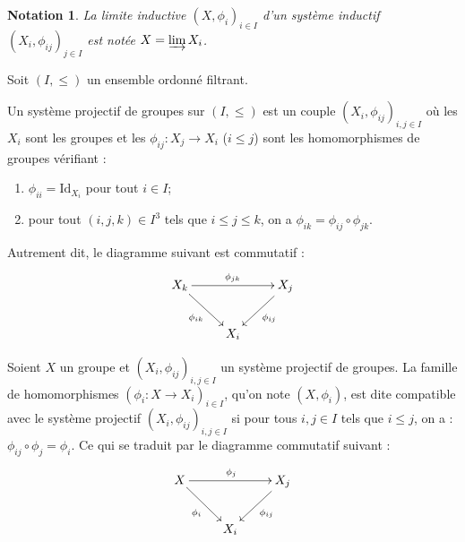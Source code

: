 \documentclass[9pt]{beamer}
\newtheorem{mynotation}{Notation}
\begin{document}
\begin{frame}
	\begin{mynotation}
La limite inductive \((X, \phi_i)_{i \in I}\) d'un système inductif \((X_i, \phi_{ij})_{j \in I}\) est notée \(X = \varinjlim X_i\).
	\end{mynotation}
	
	Soit $(I, \leq)$ un ensemble ordonné filtrant.
	
	\begin{definition}
Un système projectif de groupes sur \((I, \leq)\) est un couple \((X_{i}, \phi_{ij})_{i,j \in I}\) où les \(X_{i}\) sont les groupes et les \(\phi_{ij}: X_{j} \rightarrow X_{i}\) (\(i \leq j\)) sont les homomorphismes de groupes vérifiant :
		\begin{enumerate}[label=\roman*)]
			\item \(\phi_{ii} = \text{Id}_{X_{i}}\) pour tout \(i \in I\);
			\item pour tout \((i,j,k) \in I^{3}\) tels que \(i \leq j \leq k\), on a \(\phi_{ik} = \phi_{ij} \circ \phi_{jk}\).
		\end{enumerate}
Autrement dit, le diagramme suivant est commutatif :
		\[
		\xymatrix{
			X_{k} \ar[rr]^{\phi_{jk}} \ar[dr]_{\phi_{ik}} & & X_{j} \ar[dl]^{\phi_{ij}} \\
			& X_{i} &
		}
		\]
	\end{definition}

\end{frame}

\begin{frame}
\begin{definition}
Soient \(X\) un groupe et \((X_{i}, \phi_{ij})_{i,j \in I}\) un système projectif de groupes. La famille de homomorphismes \((\phi_{i} : X \rightarrow X_{i})_{i \in I}\), qu'on note \((X , \phi_{i})\), est dite compatible avec le système projectif \((X_{i}, \phi_{ij})_{i,j \in I}\) si pour tous \(i,j \in I\) tels que \(i \leq j\), on a : \(\phi_{ij} \circ \phi_{j} = \phi_{i}\).
	Ce qui se traduit par le diagramme commutatif suivant :
	\[
	\xymatrix{
		X \ar[rr]^{\phi_{j}} \ar[dr]_{\phi_{i}} & & X_{j} \ar[dl]^{\phi_{ij}} \\
		& X_{i} &
	}
	\]
\end{definition}
\end{frame}
\end{document}
